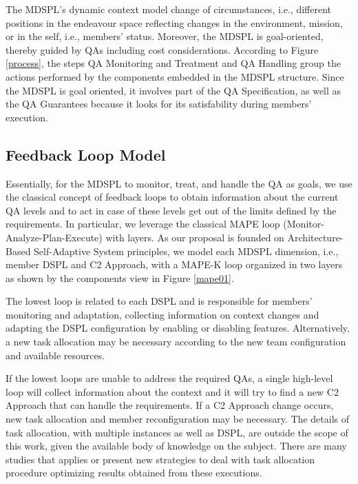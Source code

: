 \begin{center}
\end{center}


The MDSPL's dynamic context  model change of circumstances, i.e., different positions in the endeavour space  reflecting changes in the environment, mission, or in the self, i.e., members' status. Moreover, the MDSPL is goal-oriented, thereby guided by QAs including cost considerations. According to Figure \ref{process}, the steps QA Monitoring and Treatment and QA Handling group the actions performed by the components embedded in the MDSPL structure. Since the MDSPL is goal oriented, it involves part of the QA Specification, as well as the QA Guarantees because it looks for its satisfability during members' execution.



\subsection{Feedback Loop Model}

Essentially, for the MDSPL to monitor, treat, and handle the QA as goals, we use the classical concept of feedback loops to obtain information about the current QA levels and to act in case of these levels get out of the limits defined by the requirements. In particular, we leverage the classical  MAPE \cite{feedback01} loop (Monitor-Analyze-Plan-Execute) with layers. As our proposal is founded on Architecture-Based Self-Adaptive System principles, we model each MDSPL dimension, i.e., member DSPL and C2 Approach, with a MAPE-K loop organized in two layers as shown by the components view in Figure \ref{mape01}.

The lowest loop is related to each DSPL and is responsible for members' monitoring and adaptation,  collecting information on context changes and adapting the DSPL configuration by enabling or disabling features. Alternatively, a new task allocation may be necessary according to the new team configuration and available resources. 

If the lowest loops are unable to address the required QAs, a single high-level loop will collect information about the context and it will try to find a new C2 Approach that can handle the requirements. If a C2 Approach change occurs, new task allocation and member reconfiguration may be necessary. The details of task allocation, with multiple instances as well as DSPL, are outside the scope of this work, given the available body of knowledge on the subject. There are many studies \cite{Schwarzrock2017}\cite{HILAIRE20131323} that applies or present new strategies to deal with task allocation procedure optimizing results obtained from these executions.

